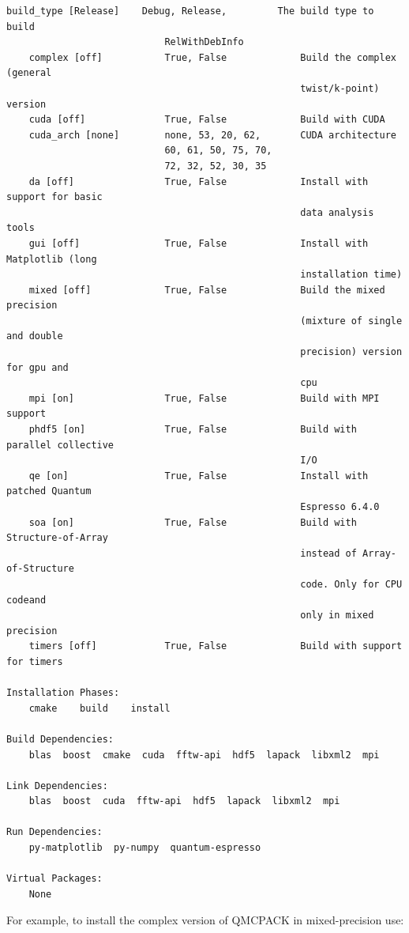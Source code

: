 \begin{lstlisting}[style=SHELL]
    build_type [Release]    Debug, Release,         The build type to build
                            RelWithDebInfo          
    complex [off]           True, False             Build the complex (general
                                                    twist/k-point) version
    cuda [off]              True, False             Build with CUDA
    cuda_arch [none]        none, 53, 20, 62,       CUDA architecture
                            60, 61, 50, 75, 70,     
                            72, 32, 52, 30, 35      
    da [off]                True, False             Install with support for basic
                                                    data analysis tools
    gui [off]               True, False             Install with Matplotlib (long
                                                    installation time)
    mixed [off]             True, False             Build the mixed precision
                                                    (mixture of single and double
                                                    precision) version for gpu and
                                                    cpu
    mpi [on]                True, False             Build with MPI support
    phdf5 [on]              True, False             Build with parallel collective
                                                    I/O
    qe [on]                 True, False             Install with patched Quantum
                                                    Espresso 6.4.0
    soa [on]                True, False             Build with Structure-of-Array
                                                    instead of Array-of-Structure
                                                    code. Only for CPU codeand
                                                    only in mixed precision
    timers [off]            True, False             Build with support for timers

Installation Phases:
    cmake    build    install

Build Dependencies:
    blas  boost  cmake  cuda  fftw-api  hdf5  lapack  libxml2  mpi

Link Dependencies:
    blas  boost  cuda  fftw-api  hdf5  lapack  libxml2  mpi

Run Dependencies:
    py-matplotlib  py-numpy  quantum-espresso

Virtual Packages: 
    None
\end{lstlisting}

For example, to install the complex version of QMCPACK in mixed-precision use:

